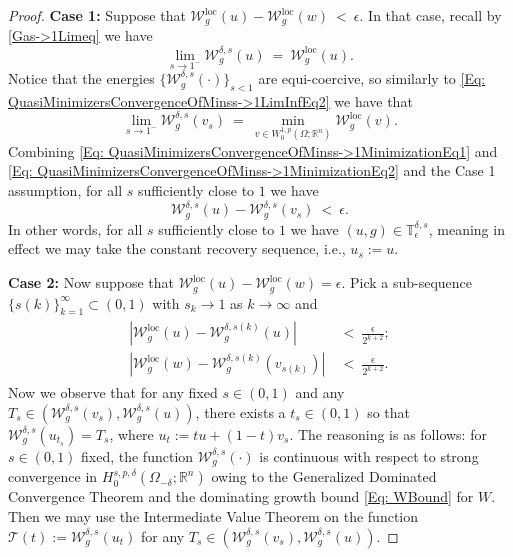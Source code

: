 \documentclass[11pt, reqno]{amsart}   	%
\theoremstyle{plain}
\numberwithin{equation}{section}
\def\de{\delta}
\def\ep{\epsilon}
\def\Om{\Omega}
\def\R{\mathbb{R}}
\def\argmin{\text{argmin}}
\def\loc{\text{loc}}
\begin{document}
\begin{proof}
     \textbf{Case 1:} Suppose that $\mathcal{W}^{\loc}_g(u) - \mathcal{W}^{\loc}_g(w) \ < \ \ep$. In that case, recall by \eqref{Gas->1Limeq} we have 
     \begin{equation}\label{Eq: QuasiMinimizersConvergenceOfMinss->1MinimizationEq1}
         \lim_{s \rightarrow 1^-}\mathcal{W}^{\de, s}_g(u) \ = \ \mathcal{W}^{\loc}_g(u).
     \end{equation}
     Notice that the energies $\{\mathcal{W}^{\de, s}_g(\cdot)\}_{s < 1}$ are equi-coercive, so  similarly to \eqref{Eq: QuasiMinimizersConvergenceOfMinss->1LimInfEq2} we have that
     \begin{equation}\label{Eq: QuasiMinimizersConvergenceOfMinss->1MinimizationEq2}
          \lim_{s \rightarrow 1^-}\mathcal{W}^{\de, s}_g(v_s) \ = \ \min_{v \in W^{1, p}_0(\Om; \R^n)}\mathcal{W}^{\loc}_g(v).
     \end{equation}
     Combining \eqref{Eq: QuasiMinimizersConvergenceOfMinss->1MinimizationEq1} and \eqref{Eq: QuasiMinimizersConvergenceOfMinss->1MinimizationEq2} and the Case 1 assumption, for all $s$ sufficiently close to $1$ we have 
     \begin{equation}\label{Eq: QuasiMinimizersConvergenceOfMinss->1MinimizationEq3}
         \mathcal{W}^{\de, s}_g(u) - \mathcal{W}^{\de, s}_g(v_s) \ < \ \ep.
     \end{equation}
     In other words, for all $s$ sufficiently close to $1$ we have $(u, g) \in \mathbb{T}^{\de, s}_{\ep}$, meaning in effect we may take the constant recovery sequence, i.e., $u_s := u$. 
     

     \textbf{Case 2:} Now suppose that $\mathcal{W}^{\loc}_g(u) - \mathcal{W}^{\loc}_g(w) = \ep$. Pick a sub-sequence $\{s(k)\}^{\infty}_{k = 1} \subset (0, 1)$ with $s_k \rightarrow 1$ as $k \rightarrow \infty$ and
     \begin{eqnarray}\label{Eq: QuasiMinimizersConvergenceOfMinss->1MinimizationEq4}
         \begin{aligned}
             |\mathcal{W}^{\loc}_g(u) - \mathcal{W}^{\de, s(k)}_g(u)| \ &< \ \frac{\ep}{2^{k + 2}}; \\
             |\mathcal{W}^{\loc}_g(w) - \mathcal{W}^{\de, s(k)}_g(v_{s(k)})| \ &< \ \frac{\ep}{2^{k + 2}}.
         \end{aligned}
     \end{eqnarray}
     Now we observe that for any fixed $s \in (0, 1)$ and any $T_s \in (\mathcal{W}^{\de, s}_g(v_s), \mathcal{W}^{\de, s}_g(u))$, there exists a $t_s \in (0, 1)$ so that $\mathcal{W}^{\de, s}_g(u_{t_s}) = T_s$, where $u_t := tu + (1 - t)v_s$. The reasoning is as follows: for $s \in (0, 1)$ fixed, the function $\mathcal{W}^{\de, s}_g(\cdot)$ is continuous with respect to strong convergence in $H^{s, p, \de}_0(\Om_{-\de}; \R^n)$ owing to the Generalized Dominated Convergence Theorem and the dominating growth bound \eqref{Eq: WBound} for $W$. Then we may use the Intermediate Value Theorem on the function $\mathcal{T}(t) := \mathcal{W}^{\de, s}_g(u_t)$ for any $T_s \in (\mathcal{W}^{\de, s}_g(v_s), \mathcal{W}^{\de, s}_g(u))$.
     

\end{proof}
\end{document}

